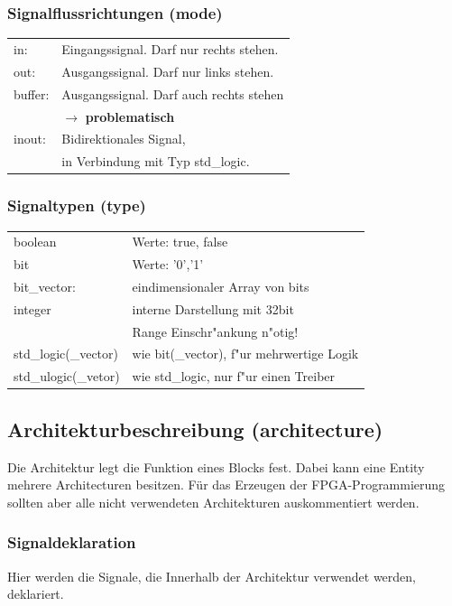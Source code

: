 	\begin{multicols}{2}
	\subsubsection{Signalflussrichtungen (mode)}
		\begin{tabular}{ll}
			in: & Eingangssignal. Darf nur rechts stehen.\\
			out: & Ausgangssignal. Darf nur links stehen.\\
			buffer: & Ausgangssignal. Darf auch rechts stehen\\
			&  $\rightarrow$ \textbf{problematisch}\\
			inout: & Bidirektionales Signal, \\
			& in Verbindung mit Typ std\_logic.\\
		\end{tabular}
	\subsubsection{Signaltypen (type)}
		\begin{tabular}{ll}
			boolean & Werte: true, false\\
			bit & Werte: '0','1'\\
			bit\_vector: & eindimensionaler Array von bits\\
			integer & interne Darstellung mit 32bit\\
			& Range Einschr"ankung n"otig!\\
			std\_logic(\_vector) & wie bit(\_vector), f"ur mehrwertige Logik\\
			std\_ulogic(\_vetor) & wie std\_logic, nur f"ur einen Treiber\\
		\end{tabular}
	\end{multicols}
	
	\newpage
	
	\subsection{Architekturbeschreibung (architecture)}
		Die Architektur legt die Funktion eines Blocks fest. Dabei kann eine Entity mehrere 				Architecturen besitzen. Für das Erzeugen der FPGA-Programmierung sollten aber alle 
		nicht verwendeten Architekturen auskommentiert werden.
		

		\subsubsection{Signaldeklaration}
			 Hier werden die Signale, die Innerhalb der Architektur verwendet werden, 
			deklariert.
				
			
